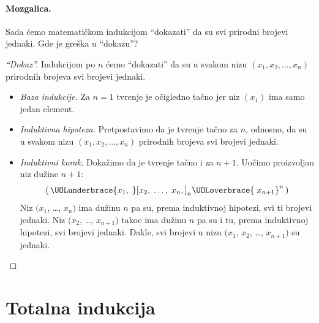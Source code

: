 \paragraph{Mozgalica.}
  Sada \'cemo matemati\v ckom indukcijom \enquote{dokazati} da su svi prirodni brojevi jednaki. Gde je gre\v ska u \enquote{dokazu}?
\begin{proof}[\enquote{Dokaz}]
  Indukcijom po $n$ \'cemo \enquote{dokazati} da su u svakom nizu $(x_1, x_2, \ldots, x_n)$ prirodnih brojeva svi brojevi jednaki.
  \begin{itemize}\itemsep -1pt
  \item
    \emph{Baza indukcije.} Za $n = 1$ tvr\dj enje je o\v cigledno ta\v cno jer niz $(x_1)$ ima samo jedan element.
  \item
    \emph{Induktivna hipoteza.} Pretpostavimo da je tvr\dj enje ta\v cno za $n$, odnosno, da su u svakom nizu
    $(x_1, x_2, \ldots, x_n)$ prirodnih brojeva svi brojevi jednaki.
  \item
    \emph{Induktivni korak.} Doka\v zimo da je tvr\dj enje ta\v cno i za $n + 1$.
    Uo\v cimo proizvoljan niz du\v zine $n + 1$:
    $$
      (\,\UOLunderbrace{\mathstrut x_1, \; }[x_2, \; \ldots, \; x_n,]_{\text{$n$}}\UOLoverbrace{\mathstrut \; x_{n+1}}^{\text{$n$}}\,)
    $$
    Niz $(x_1$, \ldots, $x_n)$ ima du\v zinu $n$ pa su, prema induktivnoj hipotezi, svi ti brojevi jednaki.
    Niz $(x_2$, \ldots, $x_{n+1})$ tako\dj e ima du\v zinu $n$ pa su i tu, prema induktivnoj hipotezi, svi brojevi jednaki.
    Dakle, svi brojevi u nizu $(x_1$, $x_2$, \ldots, $x_{n+1})$ su jednaki.\qedhere
  \end{itemize}
\end{proof}


\section{Totalna indukcija}

